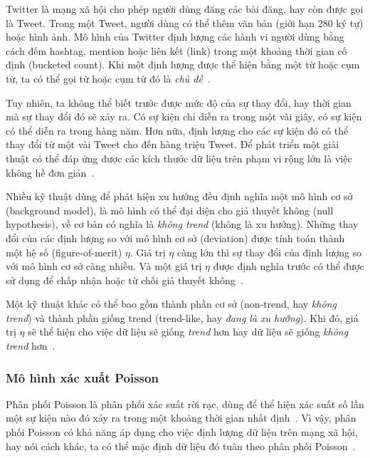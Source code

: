 Twitter là mạng xã hội cho phép người dùng đăng các bài đăng, hay còn được gọi
là Tweet. Trong một Tweet, người dùng có thể thêm văn bản (giới hạn 280 ký tự)
hoặc hình ảnh. Mô hình của Twitter định lượng các hành vi người dùng bằng cách
đếm hashtag, mention hoặc liên kết (link) trong một khoảng thời gian cố định
(bucketed count). Khi một định lượng được thể hiện bằng một từ hoặc cụm từ, ta
có thể gọi từ hoặc cụm từ đó là \textit{chủ
đề}~\cite{hendricksonTrendDetectionSocial2015}.

Tuy nhiên, ta không thể biết trước được mức độ của sự thay đổi, hay thời gian
mà sự thay đổi đó sẽ xảy ra. Có sự kiện chỉ diễn ra trong một vài giây, có sự
kiện có thể diễn ra trong hàng năm. Hơn nữa, định lượng cho các sự kiện đó có
thể thay đổi từ một vài Tweet cho đến hàng triệu Tweet. Để phát triển một giải
thuật có thể đáp ứng được các kích thước dữ liệu trên phạm vi rộng lớn là việc
không hề đơn giản~\cite{hendricksonTrendDetectionSocial2015}.

Nhiều kỹ thuật dùng để phát hiện xu hướng đều định nghĩa một mô hình cơ sở
(background model), là mô hình có thể đại diện cho giả thuyết không (null
hypothesis), về cơ bản có nghĩa là \textit{không trend} (không là xu hướng).
Những thay đổi của các định lượng so với mô hình cơ sở (deviation) được tính
toán thành một hệ số (figure-of-merit) $\eta$. Giá trị $\eta$ càng lớn thì sự
thay đổi của định lượng so với mô hình cơ sở càng nhiều. Và một giá trị $\eta$
được định nghĩa trước có thể được sử dụng để chấp nhận hoặc từ chối giả thuyết
không~\cite{hendricksonTrendDetectionSocial2015}.

Một kỹ thuật khác có thể bao gồm thành phần cơ sở (non-trend, hay \textit{không
trend}) và thành phần giống trend (trend-like, hay \textit{đang là xu hướng}).
Khi đó, giá trị $\eta$ sẽ thể hiện cho việc dữ liệu sẽ giống \textit{trend} hơn
hay dữ liệu sẽ giống \textit{không trend}
hơn~\cite{hendricksonTrendDetectionSocial2015}.

\subsubsection{Mô hình xác xuất Poisson}

Phân phối Poisson là phân phối xác suất rời rạc, dùng để thể hiện xác suất số
lần một sự kiện nào đó xảy ra trong một khoảng thời gian nhất
định~\cite{haightHandbookPoissonDistribution1967}. Vì vậy, phân phối Poisson có
khả năng áp dụng cho việc định lượng dữ liệu trên mạng xã hội, hay nói cách
khác, ta có thể mặc định dữ liệu đó tuân theo phân phối
Poisson~\cite{hendricksonTrendDetectionSocial2015}.

